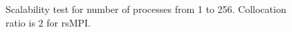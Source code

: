 \begin{figure}[!t]
	\begin{center}
	\end{center}
	\vskip -0.2in
	\caption{Scalability test for number of processes from 1 to 256. Collocation ratio is 2 for rsMPI.}
	\label{fig:scalability}
    \vspace{-0.25in}
\end{figure}

